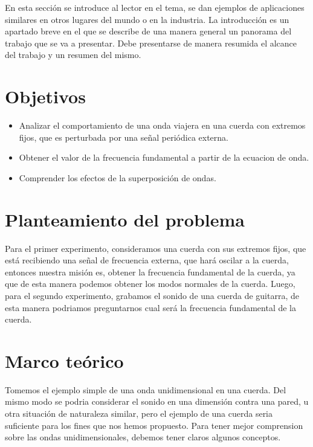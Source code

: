 \documentclass[times,5p, twocolumn]{elsarticle}
\begin{document}
En esta sección se introduce al lector en el tema, se dan ejemplos de aplicaciones similares en otros lugares del mundo o en la industria. La introducción es un apartado breve en el que se describe de una manera general un panorama del trabajo que se va a presentar. Debe presentarse de manera resumida el alcance del trabajo y un resumen del mismo.

\section{Objetivos}
\begin{itemize}
    \item Analizar el comportamiento de una onda viajera en una cuerda con extremos fijos, que es perturbada por una señal periódica externa.
\end{itemize}
\begin{itemize}
    \item Obtener el valor de la frecuencia fundamental a partir de la ecuacion de onda.
\end{itemize}
\begin{itemize}
    \item Comprender los efectos de la superposición de ondas.
\end{itemize}

\section{Planteamiento del problema}
Para el primer experimento, consideramos una cuerda con sus extremos fijos, que está recibiendo una señal de frecuencia externa, que hará oscilar a la cuerda,  entonces nuestra misión es, obtener la frecuencia fundamental de la cuerda, ya que de esta manera podemos obtener los modos normales de la cuerda. 
Luego, para el segundo experimento, grabamos el sonido de una cuerda de guitarra, de esta manera podriamos preguntarnos cual será la frecuencia fundamental de la cuerda. 


\section{Marco teórico}
Tomemos el ejemplo simple de una onda unidimensional en una cuerda. Del mismo modo se podria considerar el sonido en una dimensión contra una pared, u otra situación de naturaleza similar, pero el ejemplo de una cuerda seria suficiente para los fines que nos hemos propuesto. Para tener mejor comprension sobre las ondas unidimensionales, debemos tener claros algunos conceptos. 
\end{document}
